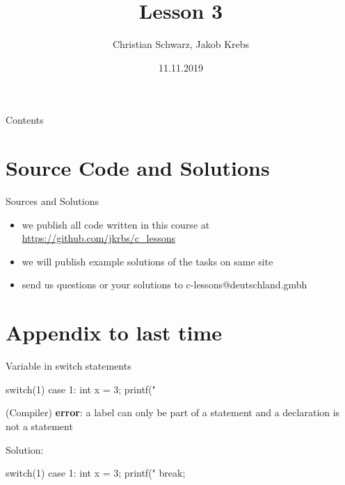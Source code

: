 \documentclass[10pt,graphics,aspectratio=169,table]{beamer}
\title{Lesson 3}
\author{Christian Schwarz, Jakob Krebs}
\date{11.11.2019}
\begin{document}
\maketitle

\begin{frame}{Contents}
    \tableofcontents
\end{frame}


\section{Source Code and Solutions}
\begin{frame}{Sources and Solutions}
    \begin{itemize}
        \item we publish all code written in this course at \url{https://github.com/jkrbs/c_lessons}
        \item we will publish example solutions of the tasks on same site
        \item send us questions or your solutions to c-lessons@deutschland.gmbh
    \end{itemize}
\end{frame}

\section{Appendix to last time}

\begin{frame}[fragile]{Variable in switch statements}
    \begin{codeblock}
switch(1){
    case 1: 
        int x = 3;
        printf("%
}
    \end{codeblock}

    (Compiler) \textbf{error}: a label can only be part of a statement and a 
       declaration is not a statement
   
    Solution:
    \begin{codeblock}
switch(1){
    case 1:{ 
        int x = 3;
        printf("%
    } break;
}
    \end{codeblock}

\end{frame}
\end{document}

